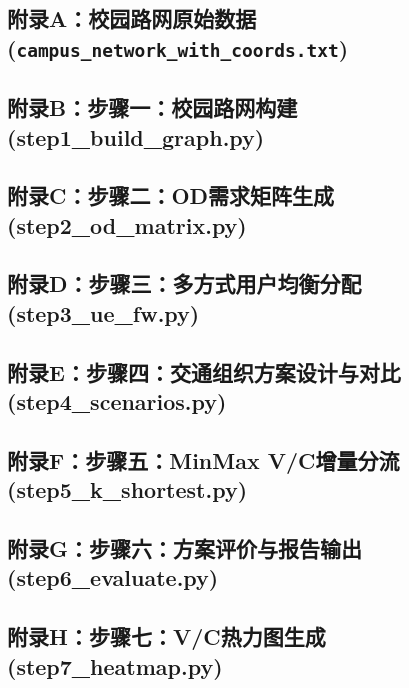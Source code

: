 \documentclass[UTF8,zihao=-4,a4paper]{ctexart}
\numberwithin{table}{section}
\numberwithin{figure}{section}
\numberwithin{equation}{section}
\begin{document}
\subsection*{附录A：校园路网原始数据 (\texttt{campus\_network\_with\_coords.txt})}



\subsection*{附录B：步骤一：校园路网构建 (step1\_build\_graph.py)}


\subsection*{附录C：步骤二：OD需求矩阵生成 (step2\_od\_matrix.py)}


\subsection*{附录D：步骤三：多方式用户均衡分配 (step3\_ue\_fw.py)}


\subsection*{附录E：步骤四：交通组织方案设计与对比 (step4\_scenarios.py)}


\subsection*{附录F：步骤五：MinMax V/C增量分流 (step5\_k\_shortest.py)}


\subsection*{附录G：步骤六：方案评价与报告输出 (step6\_evaluate.py)}


\subsection*{附录H：步骤七：V/C热力图生成 (step7\_heatmap.py)}

\end{document}
